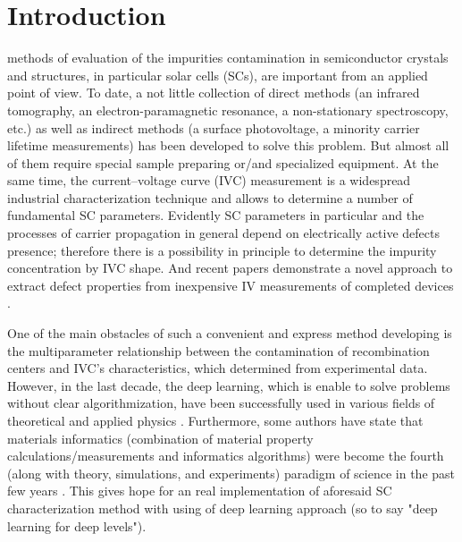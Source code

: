 \documentclass[journal]{IEEEtran}
\begin{document}
\section{Introduction}


 methods of evaluation of the impurities contamination in semiconductor crystals and structures, in particular solar cells (SCs), are important from an applied point of view.
To date, a not little collection of direct methods (an infrared tomography, an electron-paramagnetic resonance, a non-stationary spectroscopy, etc.) as well as indirect methods (a surface photovoltage, a minority carrier lifetime measurements) has been developed to solve this problem.
But almost all of them require special sample preparing or/and specialized equipment.
At the same time, the current--voltage curve (IVC) measurement is a widespread industrial characterization technique and allows to determine a number of fundamental SC parameters.
Evidently SC parameters in particular and the processes of carrier propagation in general depend on electrically active defects presence; therefore there is a possibility in principle to determine the impurity concentration by IVC shape.
And recent papers demonstrate a novel approach to extract
defect properties from inexpensive IV measurements of completed
devices \cite{HowMuchPhysics}.

One of the main obstacles of such a convenient and express method developing is the multiparameter relationship between the contamination of recombination centers and IVC's characteristics, which determined from experimental data.
However, in the last decade, the deep learning, which is enable to solve problems without clear algorithmization, have been successfully used in various fields of theoretical and applied physics \cite{MachLean_RevModPhys,MachLeanJAP,MachLeanPPV}.
Furthermore, some authors have state that materials informatics
(combination of material property calculations/measurements and informatics algorithms)
were become the fourth (along with theory, simulations, and experiments) paradigm of science in the past few years \cite{MI_JAP}.
This gives hope for an real implementation of aforesaid SC characterization method with using of deep learning approach (so to say "deep learning for deep levels").
\end{document}
